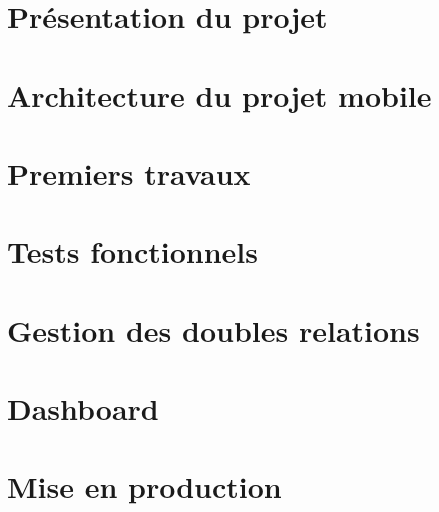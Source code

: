
\section{Présentation du projet}
\label{prezAppNeuflize}
	
	
\section{Architecture du projet mobile}
	
	
\section{Premiers travaux}
	
	
\section{Tests fonctionnels}
	
	
\section{Gestion des doubles relations}
	
	
\section{Dashboard}
	

\section{Mise en production}
	
